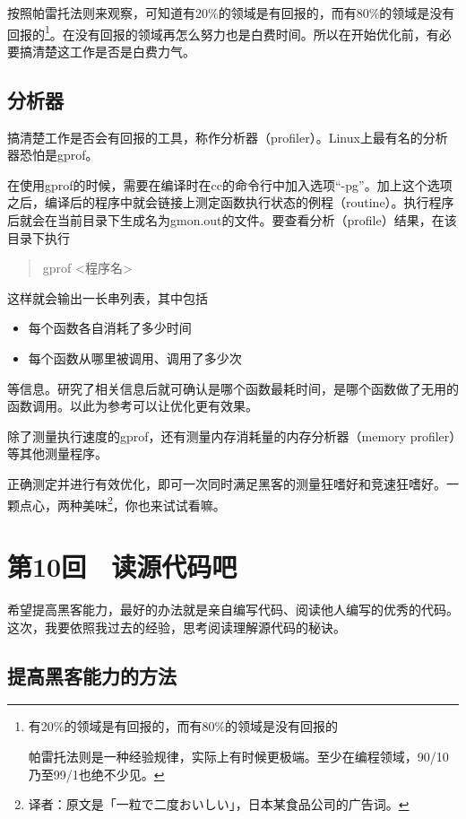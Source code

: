 \documentclass[a4paper,12pt]{article}
\newcommand\ja[1]{{\CJKfamily{gothic}#1}}
\begin{document}
按照帕雷托法则来观察，可知道有20\%的领域是有回报的，而有80\%的领域是没有回报的\footnote{有20\%的领域是有回报的，而有80\%的领域是没有回报的

帕雷托法则是一种经验规律，实际上有时候更极端。至少在编程领域，90/10乃至99/1也绝不少见。}。在没有回报的领域再怎么努力也是白费时间。所以在开始优化前，有必要搞清楚这工作是否是白费力气。

\subsection{分析器}

搞清楚工作是否会有回报的工具，称作分析器（profiler）。Linux上最有名的分析器恐怕是gprof。

在使用gprof的时候，需要在编译时在cc的命令行中加入选项“-pg”。加上这个选项之后，编译后的程序中就会链接上测定函数执行状态的例程（routine）。执行程序后就会在当前目录下生成名为gmon.out的文件。要查看分析（profile）结果，在该目录下执行
\begin{quote}
  gprof <程序名>
\end{quote}
这样就会输出一长串列表，其中包括
\begin{itemize}
\item 每个函数各自消耗了多少时间
\item 每个函数从哪里被调用、调用了多少次
\end{itemize}
等信息。研究了相关信息后就可确认是哪个函数最耗时间，是哪个函数做了无用的函数调用。以此为参考可以让优化更有效果。

除了测量执行速度的gprof，还有测量内存消耗量的内存分析器（memory profiler）等其他测量程序。

正确测定并进行有效优化，即可一次同时满足黑客的测量狂嗜好和竞速狂嗜好。一颗点心，两种美味\footnote{译者：原文是「\ja{一粒で二度おいしい}」，日本某食品公司的广告词。}，你也来试试看嘛。


\section{第10回　读源代码吧}

希望提高黑客能力，最好的办法就是亲自编写代码、阅读他人编写的优秀的代码。这次，我要依照我过去的经验，思考阅读理解源代码的秘诀。

\subsection{提高黑客能力的方法}
\end{document}
